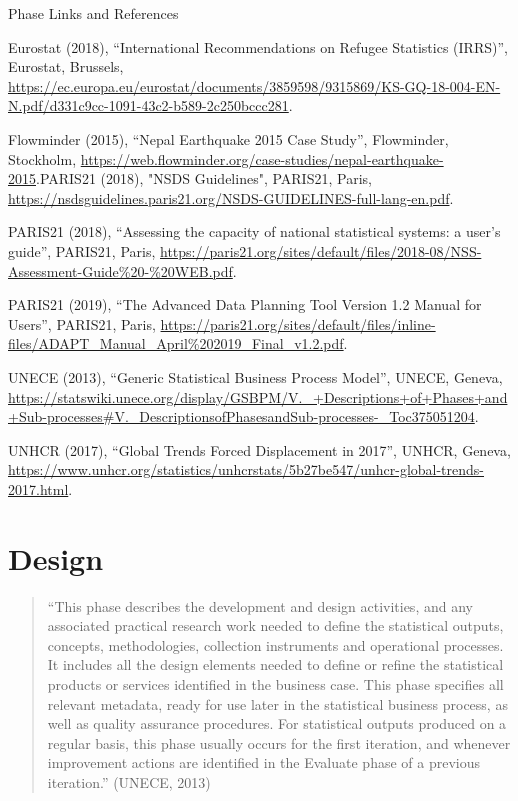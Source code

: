 \documentclass[
]{article}
\begin{document}
Phase Links and References

Eurostat (2018), ``International Recommendations on Refugee Statistics
(IRRS)'', Eurostat, Brussels,
\url{https://ec.europa.eu/eurostat/documents/3859598/9315869/KS-GQ-18-004-EN-N.pdf/d331c9cc-1091-43c2-b589-2c250bccc281}.

Flowminder (2015), ``Nepal Earthquake 2015 Case Study'', Flowminder,
Stockholm,
\url{https://web.flowminder.org/case-studies/nepal-earthquake-2015}.PARIS21
(2018), "NSDS Guidelines", PARIS21, Paris,
\url{https://nsdsguidelines.paris21.org/NSDS-GUIDELINES-full-lang-en.pdf}.

PARIS21 (2018), ``Assessing the capacity of national statistical systems:
a user's guide'', PARIS21, Paris,
\url{https://paris21.org/sites/default/files/2018-08/NSS-Assessment-Guide\%20-\%20WEB.pdf}.

PARIS21 (2019), ``The Advanced Data Planning Tool Version 1.2 Manual for
Users'', PARIS21, Paris,
\url{https://paris21.org/sites/default/files/inline-files/ADAPT_Manual_April\%202019_Final_v1.2.pdf}.

UNECE (2013), ``Generic Statistical Business Process Model'', UNECE,
Geneva,
\url{https://statswiki.unece.org/display/GSBPM/V._+Descriptions+of+Phases+and+Sub-processes\#V._DescriptionsofPhasesandSub-processes-_Toc375051204}.

UNHCR (2017), ``Global Trends Forced Displacement in 2017'', UNHCR,
Geneva,
\url{https://www.unhcr.org/statistics/unhcrstats/5b27be547/unhcr-global-trends-2017.html}.

\hypertarget{design-1}{%
\section{Design}\label{design-1}}

\begin{quote}
``This phase describes the development and design activities, and any
associated practical research work needed to define the statistical
outputs, concepts, methodologies, collection instruments and
operational processes. It includes all the design elements needed to
define or refine the statistical products or services identified in
the business case. This phase specifies all relevant metadata, ready
for use later in the statistical business process, as well as quality
assurance procedures. For statistical outputs produced on a regular
basis, this phase usually occurs for the first iteration, and whenever
improvement actions are identified in the Evaluate phase of a previous
iteration.'' (UNECE, 2013)
\end{quote}
\end{document}
